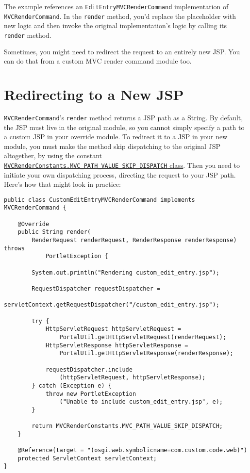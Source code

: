 The example references an \texttt{EditEntryMVCRenderCommand}
implementation of \texttt{MVCRenderCommand}. In the \texttt{render}
method, you'd replace the placeholder with new logic and then invoke the
original implementation's logic by calling its \texttt{render} method.

Sometimes, you might need to redirect the request to an entirely new
JSP. You can do that from a custom MVC render command module too.

\section{Redirecting to a New JSP}\label{redirecting-to-a-new-jsp}

\texttt{MVCRenderCommand}'s \texttt{render} method returns a JSP path as
a String. By default, the JSP must live in the original module, so you
cannot simply specify a path to a custom JSP in your override module. To
redirect it to a JSP in your new module, you must make the method skip
dispatching to the original JSP altogether, by using the constant
\href{https://docs.liferay.com/dxp/portal/7.2-latest/javadocs/portal-kernel/com/liferay/portal/kernel/portlet/bridges/mvc/MVCRenderConstants.html}{\texttt{MVCRenderConstants.MVC\_PATH\_VALUE\_SKIP\_DISPATCH}
class}. Then you need to initiate your own dispatching process,
directing the request to your JSP path. Here's how that might look in
practice:

\begin{verbatim}
public class CustomEditEntryMVCRenderCommand implements MVCRenderCommand {

    @Override
    public String render(
        RenderRequest renderRequest, RenderResponse renderResponse) throws
            PortletException {

        System.out.println("Rendering custom_edit_entry.jsp");

        RequestDispatcher requestDispatcher =
            servletContext.getRequestDispatcher("/custom_edit_entry.jsp");

        try {
            HttpServletRequest httpServletRequest = 
                PortalUtil.getHttpServletRequest(renderRequest);
            HttpServletResponse httpServletResponse = 
                PortalUtil.getHttpServletResponse(renderResponse);

            requestDispatcher.include
                (httpServletRequest, httpServletResponse);
        } catch (Exception e) {
            throw new PortletException
                ("Unable to include custom_edit_entry.jsp", e);
        }

        return MVCRenderConstants.MVC_PATH_VALUE_SKIP_DISPATCH;
    }

    @Reference(target = "(osgi.web.symbolicname=com.custom.code.web)")
    protected ServletContext servletContext;
}
\end{verbatim}

